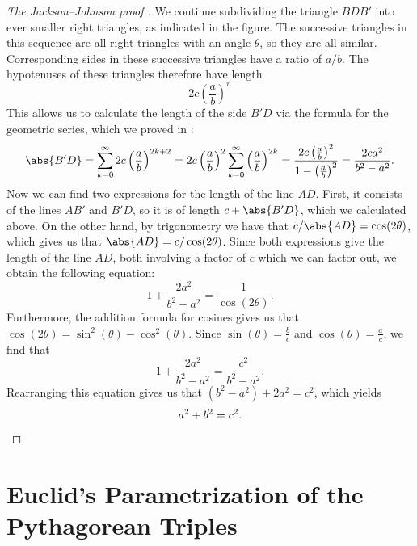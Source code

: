 \begin{proof}[The Jackson--Johnson proof \cite{jacksonjohnson2024}]
  We continue subdividing the triangle $BDB'$ into ever smaller right triangles, as indicated in the figure. The successive triangles in this sequence are all right triangles with an angle $\theta$, so they are all similar. Corresponding sides in these successive triangles have a ratio of $a/b$. The hypotenuses of these triangles therefore have length
  \begin{equation*}
    2c\left(\frac{a}{b}\right)^n
  \end{equation*}
  This allows us to calculate the length of the side $B'D$ via the formula for the geometric series, which we proved in :
  \begin{equation*}
    \abs{B'D} = \sum_{k=0}^\infty 2c\left(\frac{a}{b}\right)^{2k+2} = 2c\left(\frac{a}{b}\right)^2\sum_{k=0}^\infty \left(\frac{a}{b}\right)^{2k} = \frac{2c\left(\frac{a}{b}\right)^2}{1-\left(\frac{a}{b}\right)^2}=\frac{2ca^2}{b^2-a^2}.
  \end{equation*}
  Now we can find two expressions for the length of the line $AD$. First, it consists of the lines $AB'$ and $B'D$, so it is of length $c+\abs{B'D}$, which we calculated above. On the other hand, by trigonometry we have that $c/\abs{AD}=\cos(2\theta)$, which gives us that $\abs{AD}=c/\cos(2\theta)$. Since both expressions give the length of the line $AD$, both involving a factor of $c$ which we can factor out, we obtain the following equation:
  \begin{equation*}
    1+\frac{2a^2}{b^2-a^2} = \frac{1}{\cos(2\theta)}.
  \end{equation*}
  Furthermore, the addition formula for cosines gives us that $\cos(2\theta)=\sin^2(\theta)-\cos^2(\theta)$. Since $\sin(\theta)=\tfrac{b}{c}$ and $\cos(\theta)=\tfrac{a}{c}$, we find that
  \begin{equation*}
    1+\frac{2a^2}{b^2-a^2} = \frac{c^2}{b^2-a^2}.
  \end{equation*}
  Rearranging this equation gives us that $(b^2 - a^2)+2a^2 = c^2$, which yields
  \begin{equation*}
    a^2+b^2=c^2.\qedhere
  \end{equation*}
\end{proof}

\section{Euclid's Parametrization of the Pythagorean Triples}

